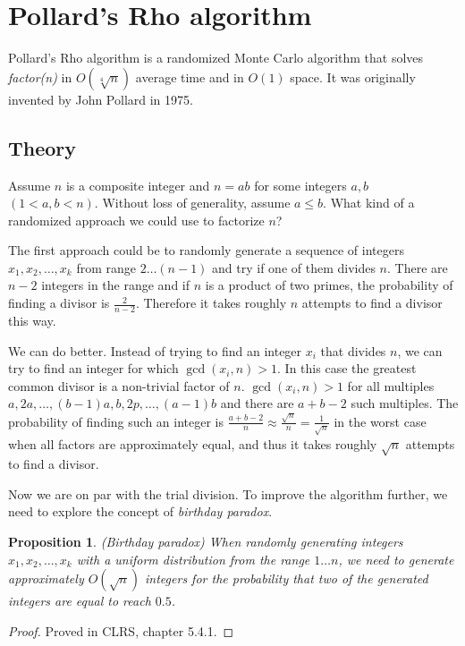 \documentclass[12pt] {article}
\theoremstyle{plain}
\newtheorem{prop}[thm]{Proposition}
\theoremstyle{definition}
\begin{document}
\section {Pollard's Rho algorithm}

Pollard's Rho algorithm is a randomized Monte Carlo algorithm that solves \textit{factor(n)} in $O(\sqrt[4]{n})$ average time and in $O(1)$ space. It was originally invented by John Pollard in 1975\cite{pollard}.

\subsection {Theory}

Assume $n$ is a composite integer and $n = ab$ for some integers $a, b$ $(1 < a, b < n)$. Without loss of generality, assume $a \leq b$. What kind of a randomized approach we could use to factorize $n$?

The first approach could be to randomly generate a sequence of integers $x_1, x_2, \dots, x_k$ from range $2 \dots (n-1)$ and try if one of them divides $n$. There are $n-2$ integers in the range and if $n$ is a product of two primes, the probability of finding a divisor is $\frac{2}{n-2}$. Therefore it takes roughly $n$ attempts to find a divisor this way.

We can do better. Instead of trying to find an integer $x_i$ that divides $n$, we can try to find an integer for which $\gcd(x_i, n) > 1$. In this case the greatest common divisor is a non-trivial factor of $n$. $\gcd(x_i, n) > 1$ for all multiples $a, 2a, \dots, (b-1)a, b, 2p, \dots, (a-1)b$ and there are $a + b - 2$ such multiples. The probability of finding such an integer is $\frac{a+b-2}{n} \approx \frac{\sqrt{n}}{n} = \frac{1}{\sqrt{n}}$ in the worst case when all factors are approximately equal, and thus it takes roughly $\sqrt{n}$ attempts to find a divisor.

Now we are on par with the trial division. To improve the algorithm further, we need to explore the concept of \textit{birthday paradox}.

\begin{prop} (Birthday paradox)
\label {prop:birthdayparadox}
When randomly generating integers $x_1, x_2, \dots, x_k$ with a uniform distribution from the range $1 \dots n$, we need to generate approximately $O(\sqrt{n})$ integers for the probability that two of the generated integers are equal to reach $0.5$.
\end{prop}

\begin{proof}
Proved in CLRS\cite{clrs}, chapter 5.4.1.
\end{proof}
\end{document}
